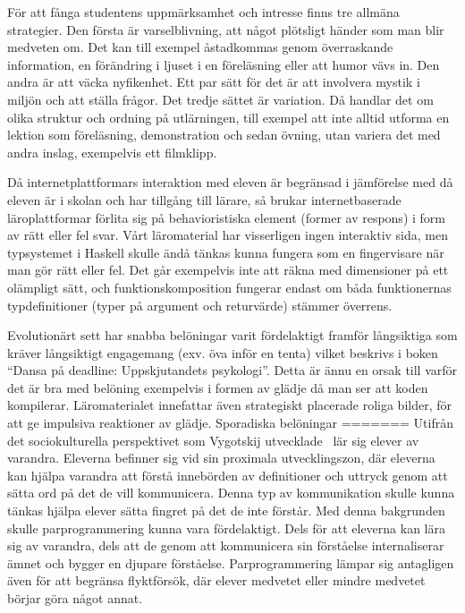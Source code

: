 \begin{draft}
För att fånga studentens uppmärksamhet och intresse finns tre allmäna
strategier. Den första är varselblivning, att något plötsligt händer som man
blir medveten om. Det kan till exempel åstadkommas genom överraskande
information, en förändring i ljuset i en föreläsning eller att humor vävs in.
Den andra är att väcka nyfikenhet. Ett par sätt för det är att involvera mystik
i miljön och att ställa frågor. Det tredje sättet är variation. Då handlar det
om olika struktur och ordning på utlärningen, till exempel att inte alltid
utforma en lektion som föreläsning, demonstration och sedan övning, utan variera
det med andra inslag, exempelvis ett filmklipp.


Då internetplattformars interaktion med eleven är begränsad i jämförelse med då
eleven är i skolan och har tillgång till lärare, så brukar internetbaserade
läroplattformar förlita sig på behavioristiska element (former av respons) i form av rätt eller fel
svar\cite{LSB_und}. Vårt läromaterial har visserligen ingen interaktiv sida,
men typsystemet i Haskell skulle ändå tänkas kunna fungera som en fingervisare
när man gör rätt eller fel. Det går exempelvis inte att räkna med dimensioner
på ett olämpligt sätt, och funktionskomposition fungerar endast om båda funktionernas
typdefinitioner (typer på argument och returvärde) stämmer överrens. 

Evolutionärt sett har snabba belöningar varit fördelaktigt framför långsiktiga
som kräver långsiktigt engagemang (exv. öva inför en tenta) vilket beskrivs i
boken ``Dansa på deadline: Uppskjutandets psykologi''\cite{DPD}. Detta är ännu en
orsak till varför det är bra med belöning exempelvis i formen av glädje då man
ser att koden kompilerar. Läromaterialet innefattar även strategiskt placerade
roliga bilder, för att ge impulsiva reaktioner av glädje. Sporadiska belöningar
=======
Utifrån det sociokulturella perspektivet som Vygotskij utvecklade~\cite{LSB_kap5}
lär sig elever av varandra. Eleverna befinner sig vid sin proximala
utvecklingszon, där eleverna kan hjälpa varandra att förstå innebörden av
definitioner och uttryck genom att sätta ord på det de vill kommunicera. Denna
typ av kommunikation skulle kunna tänkas hjälpa elever sätta fingret på det de
inte förstår. Med denna bakgrunden skulle parprogrammering kunna vara
fördelaktigt. Dels för att eleverna kan lära sig av varandra, dels att de genom att
kommunicera sin förståelse internaliserar ämnet och bygger en djupare
förståelse. Parprogrammering lämpar sig antagligen även för att begränsa
flyktförsök, där elever medvetet eller mindre medvetet börjar göra något annat.


\end{draft}
